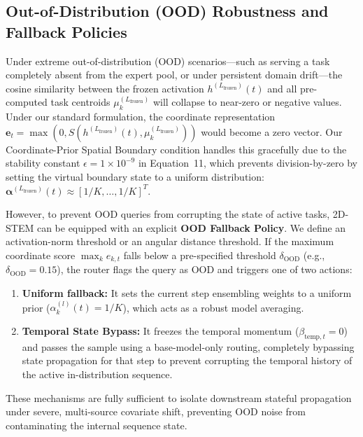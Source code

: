 \subsection{Out-of-Distribution (OOD) Robustness and Fallback Policies}
Under extreme out-of-distribution (OOD) scenarios---such as serving a task completely absent from the expert pool, or under persistent domain drift---the cosine similarity between the frozen activation $h^{(L_{\text{frozen}})}(t)$ and all pre-computed task centroids $\mu_k^{(L_{\text{frozen}})}$ will collapse to near-zero or negative values. Under our standard formulation, the coordinate representation $\mathbf{e}_t = \max(0, S(h^{(L_{\text{frozen}})}(t), \mu_k^{(L_{\text{frozen}})}))$ would become a zero vector. Our Coordinate-Prior Spatial Boundary condition handles this gracefully due to the stability constant $\epsilon = 1 \times 10^{-9}$ in Equation~11, which prevents division-by-zero by setting the virtual boundary state to a uniform distribution: $\boldsymbol{\alpha}^{(L_{\text{frozen}})}(t) \approx [1/K, \dots, 1/K]^T$.

However, to prevent OOD queries from corrupting the state of active tasks, 2D-STEM can be equipped with an explicit \textbf{OOD Fallback Policy}. We define an activation-norm threshold or an angular distance threshold. If the maximum coordinate score $\max_k e_{k,t}$ falls below a pre-specified threshold $\delta_{\text{OOD}}$ (e.g., $\delta_{\text{OOD}} = 0.15$), the router flags the query as OOD and triggers one of two actions:
\begin{enumerate}
    \item \textbf{Uniform fallback:} It sets the current step ensembling weights to a uniform prior ($\alpha_k^{(l)}(t) = 1/K$), which acts as a robust model averaging.
    \item \textbf{Temporal State Bypass:} It freezes the temporal momentum ($\beta_{\text{temp}, t} = 0$) and passes the sample using a base-model-only routing, completely bypassing state propagation for that step to prevent corrupting the temporal history of the active in-distribution sequence.
\end{enumerate}
These mechanisms are fully sufficient to isolate downstream stateful propagation under severe, multi-source covariate shift, preventing OOD noise from contaminating the internal sequence state.

